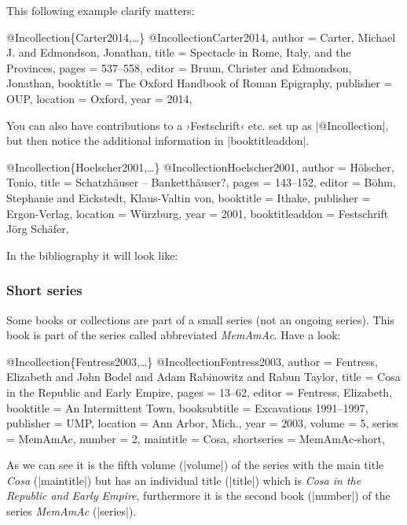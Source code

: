 \documentclass[a4paper,
10pt,
greek,
french,
spanish,
italian,
ngerman,
english,
]{ltxdoc}
\begin{document}
 
 
This following example clarify matters:
 \begin{bibexample}[label=Carter2014]{{@}Incollection\{Carter2014,…\}}
@Incollection{Carter2014,
  author    = {Carter, Michael J. and Edmondson, Jonathan},
  title     = {Spectacle in Rome, Italy, and the Provinces},
  pages     = {537--558},
  editor    = {Bruun, Christer and Edmondson, Jonathan},
  booktitle = {The Oxford Handbook of Roman Epigraphy},
  publisher = OUP,    %
  location  = {Oxford},
  year      = {2014},
}
\end{bibexample}


You can also have contributions to a ›Festschrift‹ etc. set up as |@Incollection|,
but then notice the additional information in |booktitleaddon|.
\begin{bibexample}[label=Hoelscher2001]{{@}Incollection\{Hoelscher2001,…\}}
@Incollection{Hoelscher2001,
  author         = {Hölscher, Tonio},
  title          = {Schatzhäuser -- Banketthäuser?},
  pages          = {143--152},
  editor         = {Böhm, Stephanie and Eickstedt, Klaus-Valtin von},
  booktitle      = {Ithake},
  publisher      = {Ergon-Verlag},
  location       = {Würzburg},
  year           = {2001},
  booktitleaddon = {Festschrift Jörg Schäfer},
}
\end{bibexample}
In the bibliography it will look like:

\subsubsection{Short series}
Some books or collections are part of a small series (not an ongoing series).
This book is part of the series called abbreviated \emph{MemAmAc}.
Have a look:
\begin{bibexample}[label=Fentress2003]{{@}Incollection\{Fentress2003,…\}}
@Incollection{Fentress2003,
  author       = {Fentress, Elizabeth and John Bodel and Adam Rabinowitz and Rabun Taylor},
  title        = {Cosa in the Republic and Early Empire},
  pages        = {13--62},
  editor       = {Fentress, Elizabeth},
  booktitle    = {An Intermittent Town},
  booksubtitle = {Excavations 1991--1997},
  publisher    = UMP,    %
  location     = {Ann Arbor, Mich.},
  year         = {2003},
  volume       = {5},
  series       = MemAmAc,    %
  number       = {2},
  maintitle    = {Cosa},
  shortseries  = MemAmAc-short,    %
}
\end{bibexample}
As we can see it is the fifth volume (|volume|) of the series with the main title 
\emph{Cosa} (|maintitle|) but has an individual title (|title|) which is
\emph{Cosa in the Republic and Early Empire}, furthermore it is the second book (|number|) 
of the series  \emph{MemAmAc} (|series|).
\end{document}
